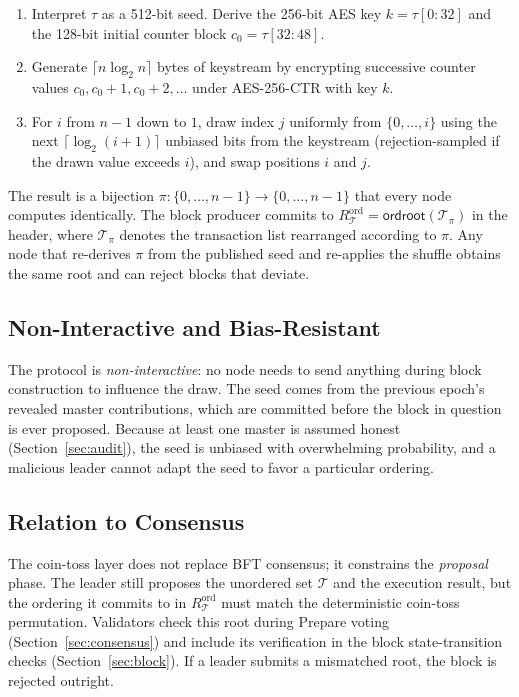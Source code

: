 \documentclass[11pt,a4paper]{article}
\theoremstyle{definition}
\begin{document}
\begin{enumerate}[label=(\arabic*),leftmargin=2em]
  \item Interpret $\tau$ as a 512-bit seed.  Derive the 256-bit AES key
    $k = \tau[0:32]$ and the 128-bit initial counter block $c_0 = \tau[32:48]$.
  \item Generate $\lceil n\log_2 n\rceil$ bytes of keystream by encrypting
    successive counter values $c_0, c_0{+}1, c_0{+}2,\ldots$ under AES-256-CTR
    with key $k$.
  \item For $i$ from $n-1$ down to $1$, draw index $j$ uniformly from
    $\{0,\dots,i\}$ using the next $\lceil\log_2(i+1)\rceil$ unbiased bits
    from the keystream (rejection-sampled if the drawn value exceeds $i$),
    and swap positions $i$ and $j$.
\end{enumerate}

The result is a bijection $\pi : \{0,\dots,n-1\} \to \{0,\dots,n-1\}$ that
every node computes identically.  The block producer commits to
$R_{\mathcal{T}}^{\mathrm{ord}} = \mathsf{ordroot}(\mathcal{T}_\pi)$ in the
header, where $\mathcal{T}_\pi$ denotes the transaction list rearranged
according to $\pi$.  Any node that re-derives $\pi$ from the published
seed and re-applies the shuffle obtains the same root and can reject blocks
that deviate.

\subsection{Non-Interactive and Bias-Resistant}

The protocol is \emph{non-interactive}: no node needs to send anything
during block construction to influence the draw.  The seed comes from the
previous epoch's revealed master contributions, which are committed before
the block in question is ever proposed.  Because at least one master is
assumed honest (Section~\ref{sec:audit}), the seed is unbiased with
overwhelming probability, and a malicious leader cannot adapt the seed to
favor a particular ordering.

\subsection{Relation to Consensus}

The coin-toss layer does not replace BFT consensus; it constrains the
\emph{proposal} phase.  The leader still proposes the unordered set
$\mathcal{T}$ and the execution result, but the ordering it commits to in
$R_{\mathcal{T}}^{\mathrm{ord}}$ must match the deterministic coin-toss
permutation.  Validators check this root during Prepare voting (Section~\ref{sec:consensus}) and include its verification in the block state-transition
checks (Section~\ref{sec:block}).  If a leader submits a
mismatched root, the block is rejected outright.
\end{document}
